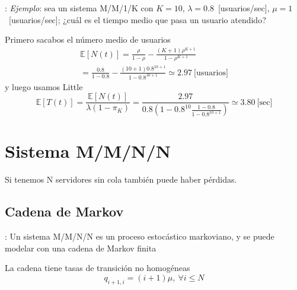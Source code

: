 \documentclass[xcolor={x11names}]{beamer}
\begin{document}
\begin{frame}{\secname: \subsecname}
    \textit{Ejemplo}: sea un sistema
    M/M/1/K con $K=10$,
    $\lambda=0.8$~[usuarios/sec],
    $\mu=1$~[usuarios/sec];
    ¿cuál es el tiempo medio que pasa
    un usuario atendido?
    \vfill
    
    Primero sacabos el número medio
    de usuarios
    \begin{multline*}
        \mathbb{E}[N(t)]=
        \frac{\rho}{1-\rho}-
        \frac{(K+1)\rho^{K+1}}{1-\rho^{K+1}}\\
        =\frac{0.8}{1-0.8}-
        \frac{(10+1)0.8^{10+1}}{1-0.8^{10+1}}
        \simeq2.97~\text{[usuarios]}
    \end{multline*}
    y luego usamos Little
    \begin{equation*}
        \mathbb{E}[T(t)]=
        \frac{\mathbb{E}[N(t)]}{\lambda(1-\pi_K)}
        = \frac{2.97}{0.8
        \left( 1- 0.8^{10}\frac{1-0.8}{1-0.8^{10+1}} \right)
        }
        \simeq 3.80~\text{[sec]}
    \end{equation*}
\end{frame}






\section{Sistema M/M/N/N}
\begin{frame}{\secname}
    Si tenemos N servidores sin cola
    también puede haber pérdidas.
    \begin{figure}
        
    \end{figure}
\end{frame}


\subsection{Cadena de Markov}
\begin{frame}{\secname: \subsecname}
    Un sistema M/M/N/N es un proceso
    estocástico markoviano, y se puede
    modelar con una cadena de Markov
    finita
    \begin{figure}
        \resizebox{!}{.15\textwidth}{%
            
        }
    \end{figure}
    La cadena tiene tasas de transición
    no homogéneas
    \begin{equation*}
        q_{i+1,i}=(i+1)\mu,\ \forall i\leq N
    \end{equation*}
    
    \begin{figure}
        \resizebox{!}{.2\textwidth}{%
            
        }
    \end{figure}
\end{frame}
\end{document}
